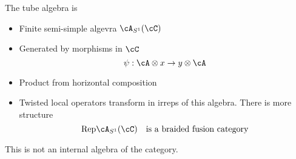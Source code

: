 The tube algebra is 
\begin{itemize}
	\item Finite semi-simple algevra $\cA_{S^1}(\cC)$
	\item Generated by morphisms in $\cC$ 
	\begin{equation}
		\psi:\cA\otimes x\rightarrow y\otimes \cA
	\end{equation}
	\item Product from horizontal composition
	\item Twisted local operators transform in irreps of this algebra. There is more structure
	\begin{equation}
		\mathrm{Rep}\cA_{S^1}(\cC)\quad \text{is a braided fusion category}
	\end{equation}
\end{itemize}
This is not an internal algebra of the category. 
